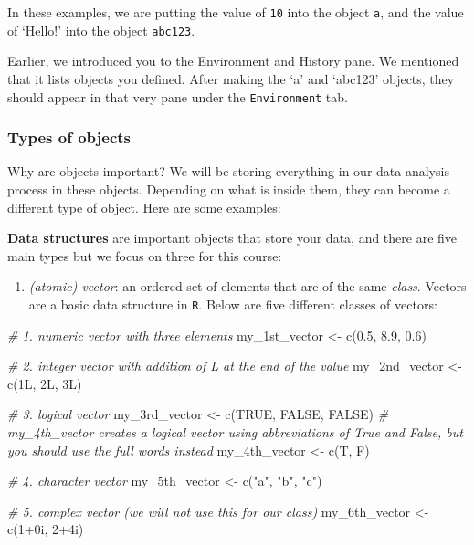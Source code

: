 \documentclass[
]{book}
\newenvironment{Shaded}{\begin{snugshade}}{\end{snugshade}}
\newcommand{\CommentTok}[1]{\textcolor[rgb]{0.56,0.35,0.01}{\textit{#1}}}
\newcommand{\ConstantTok}[1]{\textcolor[rgb]{0.00,0.00,0.00}{#1}}
\newcommand{\DecValTok}[1]{\textcolor[rgb]{0.00,0.00,0.81}{#1}}
\newcommand{\FloatTok}[1]{\textcolor[rgb]{0.00,0.00,0.81}{#1}}
\newcommand{\FunctionTok}[1]{\textcolor[rgb]{0.00,0.00,0.00}{#1}}
\newcommand{\NormalTok}[1]{#1}
\newcommand{\OtherTok}[1]{\textcolor[rgb]{0.56,0.35,0.01}{#1}}
\newcommand{\SpecialCharTok}[1]{\textcolor[rgb]{0.00,0.00,0.00}{#1}}
\newcommand{\StringTok}[1]{\textcolor[rgb]{0.31,0.60,0.02}{#1}}
\providecommand{\tightlist}{%
  \setlength{\itemsep}{0pt}\setlength{\parskip}{0pt}}
\begin{document}
In these examples, we are putting the value of \texttt{10} into the object \texttt{a}, and the value of `Hello!' into the object \texttt{abc123}.

Earlier, we introduced you to the Environment and History pane. We mentioned that it lists objects you defined. After making the `a' and `abc123' objects, they should appear in that very pane under the \texttt{Environment} tab.

\hypertarget{types-of-objects}{%
\subsubsection{Types of objects}\label{types-of-objects}}

Why are objects important? We will be storing everything in our data analysis process in these objects. Depending on what is inside them, they can become a different type of object. Here are some examples:

\textbf{Data structures} are important objects that store your data, and there are five main types but we focus on three for this course:

\begin{enumerate}
\def\labelenumi{\arabic{enumi}.}
\tightlist
\item
  \emph{(atomic) vector}: an ordered set of elements that are of the same \emph{class}. Vectors are a basic data structure in \texttt{R}. Below are five different classes of vectors:
\end{enumerate}

\begin{Shaded}
\begin{Highlighting}[]
\CommentTok{\# 1. numeric vector with three elements}
\NormalTok{my\_1st\_vector }\OtherTok{\textless{}{-}} \FunctionTok{c}\NormalTok{(}\FloatTok{0.5}\NormalTok{, }\FloatTok{8.9}\NormalTok{, }\FloatTok{0.6}\NormalTok{) }

\CommentTok{\# 2. integer vector with addition of L at the end of the value}
\NormalTok{my\_2nd\_vector }\OtherTok{\textless{}{-}} \FunctionTok{c}\NormalTok{(1L, 2L, 3L)  }

\CommentTok{\# 3. logical vector}
\NormalTok{my\_3rd\_vector }\OtherTok{\textless{}{-}} \FunctionTok{c}\NormalTok{(}\ConstantTok{TRUE}\NormalTok{, }\ConstantTok{FALSE}\NormalTok{, }\ConstantTok{FALSE}\NormalTok{) }
\CommentTok{\# \textquotesingle{}my\_4th\_vector\textquotesingle{} creates a logical vector using abbreviations of True and False, but you should use the full words instead}
\NormalTok{my\_4th\_vector }\OtherTok{\textless{}{-}} \FunctionTok{c}\NormalTok{(T, F) }

\CommentTok{\# 4. character vector}
\NormalTok{my\_5th\_vector }\OtherTok{\textless{}{-}} \FunctionTok{c}\NormalTok{(}\StringTok{"a"}\NormalTok{, }\StringTok{"b"}\NormalTok{, }\StringTok{"c"}\NormalTok{) }

\CommentTok{\# 5. complex vector (we will not use this for our class)}
\NormalTok{my\_6th\_vector }\OtherTok{\textless{}{-}} \FunctionTok{c}\NormalTok{(}\DecValTok{1}\SpecialCharTok{+}\NormalTok{0i, }\DecValTok{2}\SpecialCharTok{+}\NormalTok{4i) }
\end{Highlighting}
\end{Shaded}
\end{document}
